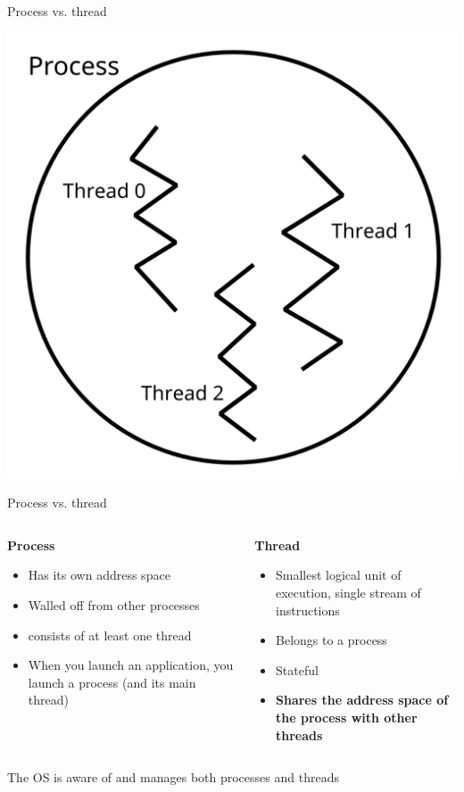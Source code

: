 \documentclass{beamer}
\begin{document}
\begin{frame}{Process vs. thread}
\begin{center}
\includegraphics[width=.65\linewidth]{proc_thread.png}
\end{center}
\end{frame}

\begin{frame}{Process vs. thread}
\begin{columns}
\begin{column}{0.5\textwidth}
\textbf{Process} \\
\begin{itemize}
\item Has its own address space
\item Walled off from other processes
\item consists of at least one thread
\item When you launch an application, you launch a process (and its main thread)
\end{itemize}
\end{column}
\begin{column}{0.5\textwidth}
\textbf{Thread} \\
\begin{itemize}
\item Smallest logical unit of execution, single stream of instructions
\item Belongs to a process
\item Stateful
\item \textbf{Shares the address space of the process with other threads}
\end{itemize}
\end{column}
\end{columns}

\vspace{.3cm}
The OS is aware of and manages both processes and threads
\end{frame}
\end{document}
